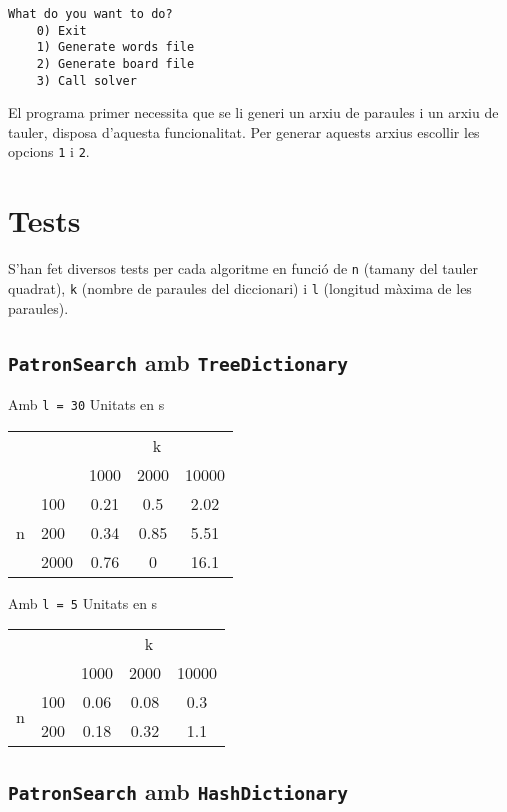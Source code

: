 \documentclass{article}
\begin{document}
\begin{lstlisting}[frame=single]
	What do you want to do?
	0) Exit
	1) Generate words file
	2) Generate board file
	3) Call solver
\end{lstlisting}

El programa primer necessita que se li generi un arxiu de paraules i un arxiu de tauler, disposa d'aquesta funcionalitat. Per generar aquests arxius escollir les opcions \verb|1| i \verb|2|.

\section{Tests}

S'han fet diversos tests per cada algoritme en funció de \verb|n| (tamany del tauler quadrat), \verb|k| (nombre de paraules del diccionari) i \verb|l| (longitud màxima de les paraules).

\subsection{\texttt{PatronSearch} amb \texttt{TreeDictionary}}

Amb \verb|l = 30|
Unitats en s

\begin{tabular}{cl||c|c|c}
	\multicolumn{2}{c}{ } & \multicolumn{3}{c}{k} \\
	 & & 1000 & 2000 & 10000 \\
	\cline{2-5}
	\multirow{3}{*}{n} 
	& 100 & 0.21 & 0.5 & 2.02 \\
	& 200 & 0.34 & 0.85 & 5.51 \\
	& 2000 & 0.76 & 0 & 16.1 \\
\end{tabular}

Amb \verb|l = 5|
Unitats en s

\begin{tabular}{cl||c|c|c}
	\multicolumn{2}{c}{ } & \multicolumn{3}{c}{k} \\
	& & 1000 & 2000 & 10000 \\
	\cline{2-5}
	\multirow{2}{*}{n} 
	& 100 & 0.06 & 0.08 & 0.3 \\
	& 200 & 0.18 & 0.32 & 1.1 \\
\end{tabular}

\subsection{\texttt{PatronSearch} amb \texttt{HashDictionary}}
\end{document}
